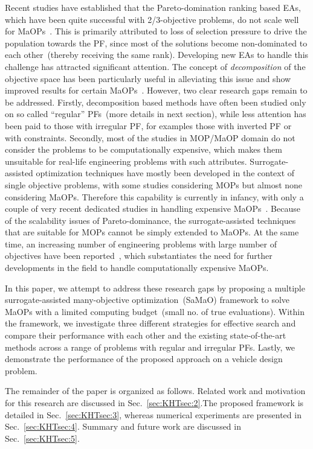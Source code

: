 \documentclass[twocolumn,10pt]{asme2ej}
\begin{document}
Recent studies have established that the Pareto-domination ranking based EAs, which have been quite successful with 2/3-objective problems, do not scale well for MaOPs~\cite{KHTishibuchi2008evolutionary}. This is primarily attributed to loss of selection pressure to drive the population towards the PF, since most of the solutions become non-dominated to each other~(thereby receiving the same rank). Developing new EAs to handle this challenge has attracted significant attention. The concept of \textit{decomposition} of the objective space has been particularly useful in alleviating this issue and show improved results for certain MaOPs~\cite{KHTtrivedisurvey}. However, two clear research gaps remain to be addressed. Firstly, decomposition based methods have often been studied only on so called ``regular'' PFs~(more details in next section), while less attention has been paid to those with irregular PF, for examples those with inverted PF or with constraints. Secondly, most of the studies in MOP/MaOP domain do not consider the problems to be computationally expensive, which makes them unsuitable for real-life engineering problems with such attributes. Surrogate-assisted optimization techniques have mostly been developed in the context of single objective problems, with some studies considering MOPs but almost none considering MaOPs. Therefore this capability is currently in infancy, with only a couple of very recent dedicated studies in handling expensive MaOPs~\cite{KHTchugh2016krvea,KHTchugh2016const}. Because of the scalability issues of Pareto-dominance, the surrogate-assisted techniques that are suitable for MOPs cannot be simply extended to MaOPs. At the same time, an increasing number of engineering problems with large number of objectives have been reported~\cite{KHTjmd2017,Asafuddoula2015}, which substantiates the need for further developments in the field to handle computationally expensive MaOPs.  

In this paper, we attempt to address these research gaps by proposing a multiple surrogate-assisted many-objective optimization~(SaMaO) framework to solve MaOPs with a limited computing budget~(small no. of true evaluations). Within the framework, we investigate three different strategies for effective search and compare their performance with each other and the existing state-of-the-art methods across a range of problems with regular and irregular PFs. Lastly, we demonstrate the performance of the proposed approach on a vehicle design problem. 

The remainder of the paper is organized as follows. Related work and motivation for this research are discussed in Sec.~\ref{sec:KHTsec:2}.The proposed framework is detailed in Sec.~\ref{sec:KHTsec:3}, whereas numerical experiments are presented in Sec.~\ref{sec:KHTsec:4}. Summary and future work are discussed in Sec.~\ref{sec:KHTsec:5}.
\end{document}
